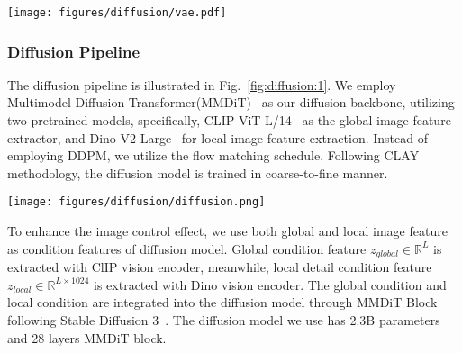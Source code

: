


\begin{figure*}
    \centering 
    \texttt{[image: figures/diffusion/vae.pdf]}
    \caption[3D Geometry variational autoencoder.]
    {3D Geometry variational autoencoder. (A): Our base VAE for 3D geometry compression. (B) Extended VAE for efficient 3D geometry compression.}
    \label{fig:vae}
\end{figure*}



\subsubsection{Diffusion Pipeline}

The diffusion pipeline is illustrated in Fig.~\ref{fig:diffusion:1}. We employ Multimodel Diffusion Transformer(MMDiT)~\cite{esser2024scaling} as our diffusion backbone, utilizing two pretrained models, specifically, CLIP-ViT-L/14~\cite{radford2021learning} as the global image feature extractor, and Dino-V2-Large~\cite{oquab2023dinov2} for local image feature extraction. Instead of employing DDPM, we utilize the flow matching schedule. Following CLAY~\cite{zhang2024clay} methodology, the diffusion model is trained in coarse-to-fine manner.

\begin{figure*}
    \centering 
    \texttt{[image: figures/diffusion/diffusion.png]}
    \caption[Diffusion pipline.]
    {Diffusion pipline. In the process of training a diffusion model, the DinoV2, CLIP, and VAE Decoder components are kept frozen}
    \label{fig:diffusion:1}
\end{figure*}

To enhance the image control effect, we use both global and local image feature as condition features of diffusion model. Global condition feature $z_{global} \in \mathbb{R}^L$ is extracted with ClIP vision encoder, meanwhile, local detail condition feature $z_{local} \in \mathbb{R}^{L \times 1024}$ is extracted with Dino vision encoder. The global condition and local condition are integrated into the diffusion model through MMDiT Block following Stable Diffusion 3~\cite{esser2024scaling}. The diffusion model we use has 2.3B parameters and 28 layers MMDiT block.

